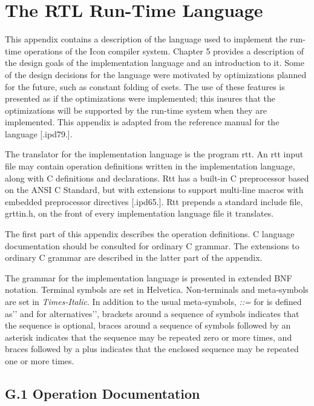 \chapter{The RTL Run-Time Language }

This appendix contains a description of the language used to implement
the run-time operations of the Icon compiler system. Chapter 5
provides a description of the design goals of the implementation
language and an introduction to it.  Some of the design decisions for
the language were motivated by optimizations planned for the future,
such as constant folding of csets. The use of these features is
presented as if the optimizations were implemented; this insures that
the optimizations will be supported by the run-time system when they
are implemented. This appendix is adapted from the reference manual
for the language [.ipd79.].

The translator for the implementation language is the program rtt. An
rtt input file may contain operation definitions written in the
implementation language, along with C definitions and
declarations. Rtt has a built-in C preprocessor based on the ANSI C
Standard, but with extensions to support multi-line macros with
embedded preprocessor directives [.ipd65.]. Rtt prepends a standard
include file, grttin.h, on the front of every implementation language
file it translates.

The first part of this appendix describes the operation definitions. C
language documentation should be consulted for ordinary C grammar. The
extensions to ordinary C grammar are described in the latter part of
the appendix.

The grammar for the implementation language is presented in extended
BNF notation. Terminal symbols are set in Helvetica. Non-terminals and
meta-symbols are set in \textit{Times-Italic}. In addition to the
usual meta-symbols, \textit{::=} for
{\textasciigrave}{\textasciigrave}is defined as'{}' and
\textit{{\textbar}} for
{\textasciigrave}{\textasciigrave}alternatives'{}', brackets around a
sequence of symbols indicates that the sequence is optional, braces
around a sequence of symbols followed by an asterisk indicates that
the sequence may be repeated zero or more times, and braces followed
by a plus indicates that the enclosed sequence may be repeated one or
more times.

\section{G.1 Operation Documentation }

